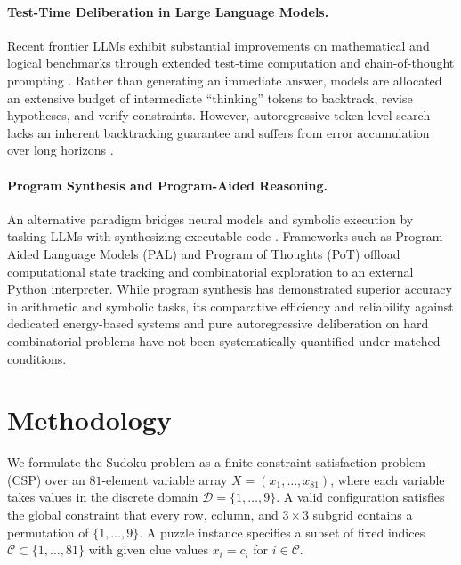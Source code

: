 \documentclass{article} %
\begin{document}
\paragraph{Test-Time Deliberation in Large Language Models.}
Recent frontier LLMs exhibit substantial improvements on mathematical and logical benchmarks through extended test-time computation and chain-of-thought prompting \citep{wei2022chain,wang2022selfconsistency,snell2024scaling}. Rather than generating an immediate answer, models are allocated an extensive budget of intermediate ``thinking'' tokens to backtrack, revise hypotheses, and verify constraints. However, autoregressive token-level search lacks an inherent backtracking guarantee and suffers from error accumulation over long horizons \citep{dziri2023faith,valmeekam2023planning}.

\paragraph{Program Synthesis and Program-Aided Reasoning.}
An alternative paradigm bridges neural models and symbolic execution by tasking LLMs with synthesizing executable code \citep{chen2021codex,austin2021program}. Frameworks such as Program-Aided Language Models (PAL) \citep{gao2023pal} and Program of Thoughts (PoT) \citep{chen2022program} offload computational state tracking and combinatorial exploration to an external Python interpreter. While program synthesis has demonstrated superior accuracy in arithmetic and symbolic tasks, its comparative efficiency and reliability against dedicated energy-based systems and pure autoregressive deliberation on hard combinatorial problems have not been systematically quantified under matched conditions.

\section{Methodology}
\label{sec:method}

We formulate the Sudoku problem as a finite constraint satisfaction problem (CSP) over an $81$-element variable array $X = (x_1, \dots, x_{81})$, where each variable takes values in the discrete domain $\mathcal{D} = \{1, \dots, 9\}$. A valid configuration satisfies the global constraint that every row, column, and $3 \times 3$ subgrid contains a permutation of $\{1, \dots, 9\}$. A puzzle instance specifies a subset of fixed indices $\mathcal{C} \subset \{1, \dots, 81\}$ with given clue values $x_i = c_i$ for $i \in \mathcal{C}$.
\end{document}
